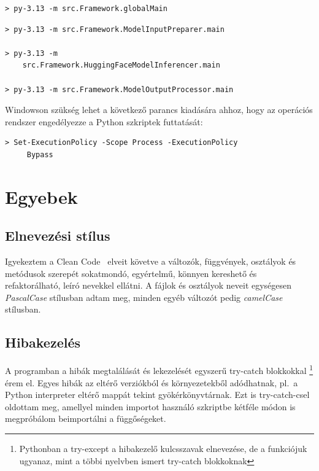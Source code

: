 \documentclass[12pt]{report}
\begin{document}
    \begin{lstlisting}
> py-3.13 -m src.Framework.globalMain
    \end{lstlisting}

    \begin{lstlisting}
> py-3.13 -m src.Framework.ModelInputPreparer.main

> py-3.13 -m 
    src.Framework.HuggingFaceModelInferencer.main

> py-3.13 -m src.Framework.ModelOutputProcessor.main
    \end{lstlisting}

    Windowson szükség lehet a következő parancs kiadására ahhoz,
    hogy az operációs rendszer engedélyezze a Python szkriptek futtatását:

    \begin{lstlisting}
> Set-ExecutionPolicy -Scope Process -ExecutionPolicy
     Bypass
    \end{lstlisting}





    \section{Egyebek}
    \subsection{Elnevezési stílus}
    Igyekeztem a Clean Code~\cite{martin2008cleancode} elveit követve a változók, függvények, osztályok és metódusok szerepét sokatmondó, egyértelmű, könnyen kereshető és refaktorálható, leíró nevekkel ellátni.
    A fájlok és osztályok neveit  egységesen \textit{PascalCase} stílusban adtam meg, minden egyéb változót pedig \textit{camelCase} stílusban.

    \subsection{Hibakezelés}
    A programban a hibák megtalálását és lekezelését egyszerű try-catch blokkokkal \footnote{Pythonban a try-except a hibakezelő kulcsszavak elnevezése, de a funkciójuk ugyanaz, mint a többi nyelvben ismert try-catch blokkoknak} érem el.
    Egyes hibák az eltérő verziókból és környezetekből adódhatnak, pl.\ a Python interpreter eltérő mappát tekint gyökérkönyvtárnak.
    Ezt is try-catch-csel oldottam meg, amellyel minden importot használó szkriptbe kétféle módon is megpróbálom beimportálni a függőségeket.
\end{document}
